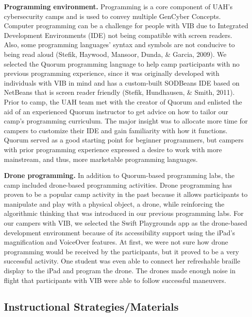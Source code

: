 \documentclass[11.5pt]{sig-alternate} %
\begin{document}
\begin{large}
\textbf{Programming environment.} Programming is a core component of UAH’s cybersecurity camps and is used to convey multiple GenCyber Concepts. Computer programming can be a challenge for people with VIB due to Integrated Development Environments (IDE) not being compatible with screen readers. Also, some programming languages’ syntax and symbols are not conducive to being read aloud (Stefik, Haywood, Mansoor, Dunda, \& Garcia, 2009). We selected the Quorum programming language to help camp participants with no previous programming experience, since it was originally developed with individuals with VIB in mind and has a custom-built SODBeans IDE based on NetBeans that is screen reader friendly (Stefik, Hundhausen, \& Smith, 2011). Prior to camp, the UAH team met with the creator of Quorum and enlisted the aid of an experienced Quorum instructor to get advice on how to tailor our camp’s programming curriculum. The major insight was to allocate more time for campers to customize their IDE and gain familiarity with how it functions. Quorum served as a good starting point for beginner programmers, but campers with prior programming experience expressed a desire to work with more mainstream, and thus, more marketable programming languages.

\textbf{Drone programming.} In addition to Quorum-based programming labs, the camp included drone-based programming activities. Drone programming has proven to be a popular camp activity in the past because it allows participants to manipulate and play with a physical object, a drone, while reinforcing the algorithmic thinking that was introduced in our previous programming labs. For our campers with VIB, we selected the Swift Playgrounds app as the drone-based development environment because of its accessibility support using the iPad’s magnification and VoiceOver features. At first, we were not sure how drone programming would be received by the participants, but it proved to be a very successful activity. One student was even able to connect her refreshable braille display to the iPad and program the drone. The drones made enough noise in flight that participants with VIB were able to follow successful maneuvers. 

\subsection*{Instructional Strategies/Materials}


\end{large}
\end{document}
